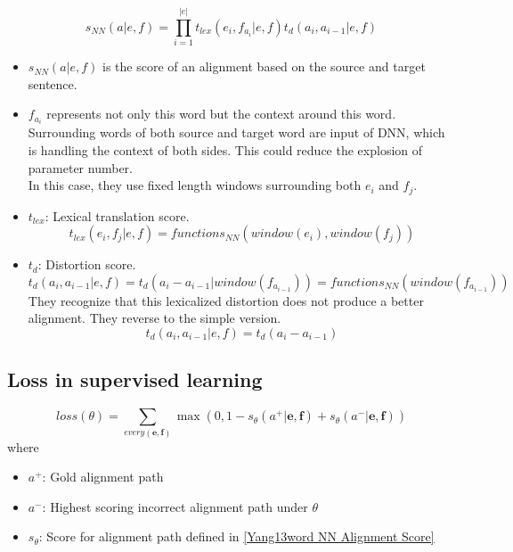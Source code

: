 \documentclass{article}
\begin{document}
\begin{equation}
s_{NN}(a|e, f) = \prod_{i = 1}^{|e|} t_{lex}(e_{i},f_{a_{i}}|e,f) t_{d}(a_{i},a_{i-1}|e,f)
\label{Yang13word NN Alignment Score}
\end{equation}

	\begin{itemize}
	\item $s_{NN}(a|e, f)$ is the score of an alignment based on the source and target sentence.
	\item $f_{a_{i}}$ represents not only this word but the context around this word. Surrounding words of both source and target word are input of DNN, which is handling the context of both sides. This could reduce the explosion of parameter number. \\ In this case, they use fixed length windows surrounding both $e_{i}$ and $f_{j}$. 
	\item $t_{lex}$: Lexical translation score.
	\begin{equation}
	t_{lex}(e_{i},f_{j}|e,f) = functions_{NN}(window(e_{i}),window(f_{j}) )
	\label{Yang13word Lexical Translation Score}
	\end{equation}
	\item $t_{d}$: Distortion score.
	\begin{equation}
	t_{d}(a_{i}, a_{i-1}|e,f) = t_{d}(a_{i} - a_{i-1}|window(f_{a_{i-1}})) = functions_{NN}(window(f_{a_{i-1}}))
	\end{equation}
	They recognize that this lexicalized distortion does not produce a better alignment. They reverse to the simple version.
	\begin{equation}
	t_{d}(a_{i}, a_{i-1}|e,f) = t_{d}(a_{i} - a_{i-1})
	\label{Yang13word Alignment Translation Score}
	\end{equation}
	\end{itemize}

\subsection{Loss in supervised learning}
\begin{equation}
loss(\theta) = \sum_{every(\textbf{e},\textbf{f})} \max(0 , 1 - s_{\theta}(a^+ |\textbf{e},\textbf{f}) + s_{\theta}(a^- |\textbf{e},\textbf{f}) )
\label{Yang13word Alignment Loss}
\end{equation}
where
\begin{itemize}
\item $a^+$: Gold alignment path
\item $a^-$: Highest scoring incorrect alignment path under $\theta$
\item $s_\theta$: Score for alignment path defined in \eqref{Yang13word NN Alignment Score}
\end{itemize}
\end{document}
